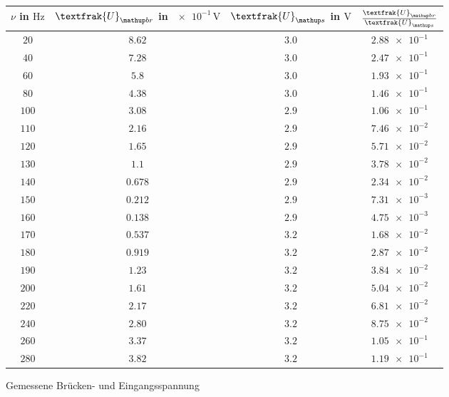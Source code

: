 \begin{figure}
\centering
\caption{Gemessene Brücken- und Eingangsspannung}
  \label{tab:U_br_u-s}
\begin{tabular}{S S S S}
    \toprule
    {$\nu$  in $\si{\hertz}$} &  {$\textfrak{U}\ua{br}$ in $\num{e-1}\,\si{\volt}$} & {$\textfrak{U}\ua{s}$  in $\si{\volt}$} & {$\frac{\textfrak{U}\ua{br}}{\textfrak{U}\ua{s}}$} \\
    \midrule
     {$\num{20}$} & {$\num{8.62}$} &  {$\num{3.0}$}& {$\num{2.88e-1}$}  \\
     {$\num{40}$} & {$\num{7.28}$}  & {$\num{3.0}$} & {$\num{2.47e-1}$} \\
     {$\num{60}$} & {$\num{5.8}$}  & {$\num{3.0}$} & {$\num{1.93e-1}$}  \\
     {$\num{80}$} & {$\num{4.38}$}  & {$\num{3.0}$} & {$\num{1.46e-1}$}  \\
     {$\num{100}$} & {$\num{3.08}$}  & {$\num{2.9}$} & {$\num{1.06e-1}$}  \\
     {$\num{110}$} & {$\num{2.16}$}  & {$\num{2.9}$} & {$\num{7.46e-2}$}  \\
     {$\num{120}$} & {$\num{1.65}$}  & {$\num{2.9}$} & {$\num{5.71e-2}$}  \\
     {$\num{130}$} & {$\num{1.1}$}  & {$\num{2.9}$} & {$\num{3.78e-2}$}  \\
     {$\num{140}$} & {$\num{0.678}$}  & {$\num{2.9}$} & {$\num{2.34e-2}$}  \\
     {$\num{150}$} & {$\num{0.212}$}  & {$\num{2.9}$} & {$\num{7.31e-3}$}  \\
     {$\num{160}$} & {$\num{0.138}$}  & {$\num{2.9}$} & {$\num{4.75e-3}$}  \\
     {$\num{170}$} & {$\num{0.537}$}  & {$\num{3.2}$} & {$\num{1.68e-2}$}  \\
     {$\num{180}$} & {$\num{0.919}$}  & {$\num{3.2}$} & {$\num{2.87e-2}$}  \\
     {$\num{190}$} & {$\num{1.23}$}  & {$\num{3.2}$} & {$\num{3.84e-2}$}  \\
     {$\num{200}$} & {$\num{1.61}$}  & {$\num{3.2}$} & {$\num{5.04e-2}$}  \\
     {$\num{220}$} & {$\num{2.17}$}  & {$\num{3.2}$} & {$\num{6.81e-2}$}  \\
     {$\num{240}$} & {$\num{2.80}$}  & {$\num{3.2}$} & {$\num{8.75e-2}$}  \\
     {$\num{260}$} & {$\num{3.37}$}  & {$\num{3.2}$} & {$\num{1.05e-1}$}  \\
     {$\num{280}$} & {$\num{3.82}$}  & {$\num{3.2}$} & {$\num{1.19e-1}$}  \\

\end{tabular}
\end{figure}
